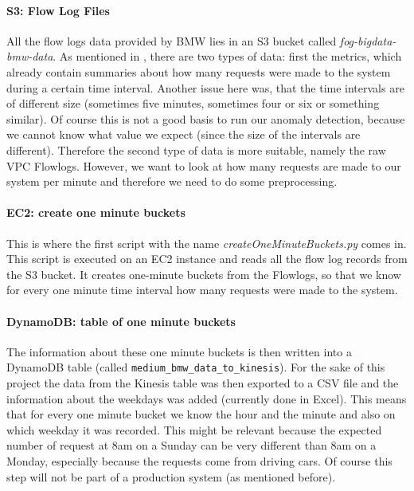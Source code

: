    \paragraph{S3: Flow Log Files}
    All the flow logs data provided by BMW lies in an S3 bucket called \textit{fog-bigdata-bmw-data}. As mentioned in \pageref{sec:fixed_data}, there are two types of data: first the metrics, which already contain summaries about how many requests were made to the system during a certain time interval. Another issue here was, that the time intervals are of different size (sometimes five minutes, sometimes four or six or something similar). Of course this is not a good basis to run our anomaly detection, because we cannot know what value we expect (since the size of the intervals are different). Therefore the second type of data is more suitable, namely the raw VPC Flowlogs. However, we want to look at how many requests are made to our system per minute and therefore we need to do some preprocessing.
    
    \paragraph{EC2: create one minute buckets}
    This is where the first script with the name \textit{createOneMinuteBuckets.py} comes in. This script is executed on an EC2 instance and reads all the flow log records from the S3 bucket. It creates one-minute buckets from the Flowlogs, so that we know for every one minute time interval how many requests were made to the system. 
    
    \paragraph{DynamoDB: table of one minute buckets}
    The information about these one minute buckets is then written into a DynamoDB table (called \verb|medium_bmw_data_to_kinesis|). For the sake of this project the data from the Kinesis table was then exported to a CSV file and the information about the weekdays was added (currently done in Excel). This means that for every one minute bucket we know the hour and the minute and also on which weekday it was recorded. This might be relevant because the expected number of request at 8am on a Sunday can be very different than 8am on a Monday, especially because the requests come from driving cars.  Of course this step will not be part of a production system (as mentioned before).
    
